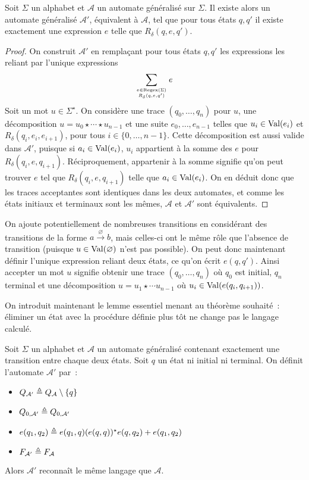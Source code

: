 \begin{proposition}
  Soit $\Sigma$ un alphabet et $\mathcal A$ un automate généralisé sur $\Sigma$.
  Il existe alors un automate généralisé $\mathcal A'$, équivalent à
  $\mathcal A$, tel que pour tous états $q,q'$ il existe exactement une
  expression $e$ telle que $R_\delta(q,e,q')$.
\end{proposition}

\begin{proof}
  On construit $\mathcal A'$ en remplaçant pour tous états $q,q'$ les
  expressions les reliant par l'unique expressions
  \[\sum_{e \in \operatorname{Regex}(\Sigma)\atop{R_\delta(q,e,q')}} e\]
  Soit un mot $u\in \Sigma^\star$. On considère une trace $(q_0,\ldots,q_n)$
  pour $u$, une décomposition $u = u_0\star\cdots\star u_{n-1}$ et une suite
  $e_0,\ldots, e_{n-1}$ telles que $u_i \in \operatorname{Val}(e_i)$ et
  $R_\delta(q_i,e_i,e_{i+1})$, pour tous $i \in \{0,\ldots,n-1\}$.
  Cette décomposition est aussi valide dans $\mathcal A'$, puisque si
  $a_i \in \operatorname{Val}(e_i)$, $u_i$ appartient à la somme des $e$ pour
  $R_\delta(q_i,e,q_{i+1})$. Réciproquement, appartenir à la somme signifie qu'on
  peut trouver $e$ tel que $R_\delta(q_i,e,q_{i+1})$ telle que
  $a_i \in \operatorname{Val}(e_i)$. On en déduit donc que les traces acceptantes sont
  identiques dans les deux automates, et comme les états initiaux et terminaux
  sont les mêmes, $\mathcal A$ et $\mathcal A'$ sont équivalents.
\end{proof}

\begin{remark}
  On ajoute potentiellement de nombreuses transitions en considérant des
  transitions de la forme $a\xrightarrow \varnothing b$, mais celles-ci ont le
  même rôle que l'absence de transition (puisque $u \in \operatorname{Val}(\varnothing)$ n'est
  pas possible). On peut donc maintenant définir l'unique expression reliant
  deux états, ce qu'on écrit $e(q,q')$. Ainsi accepter un mot $u$ signifie
  obtenir une trace $(q_0,\ldots,q_n)$ où $q_0$ est initial, $q_n$ terminal et
  une décomposition $u = u_1\star \cdots u_{n-1}$ où
  $u_i \in \operatorname{Val}(e(q_i,q_{i+1}))$.
\end{remark}

On introduit maintenant le lemme essentiel menant au théorème souhaité~:
éliminer un état avec la procédure définie plus tôt ne change pas le langage
calculé.

\begin{lemma}\label{lem.elim.state}
  Soit $\Sigma$ un alphabet et $\mathcal A$ un automate généralisé contenant
  exactement une transition entre chaque deux états. Soit $q$ un état ni initial
  ni terminal. On définit l'automate $\mathcal A'$ par~:
  \begin{itemize}
  \item $Q_{\mathcal A'} \triangleq Q_{\mathcal A} \setminus \{q\}$
  \item $Q_{0,\mathcal A'} \triangleq Q_{0,\mathcal A'}$
  \item $e(q_1,q_2) \triangleq e(q_1,q) (e(q,q))^\star e(q,q_2) + e(q_1,q_2)$
  \item $F_{\mathcal A'} \triangleq F_{\mathcal A}$
  \end{itemize}
  Alors $\mathcal A'$ reconnaît le même langage que $\mathcal A$.
\end{lemma}

